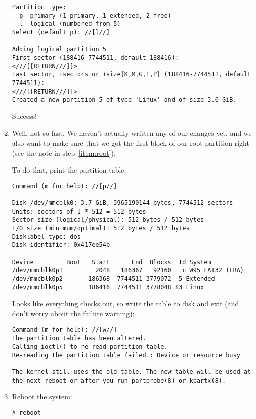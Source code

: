 \documentclass[12pt,letterpaper]{article}
\begin{document}
\begin{enumerate}
\begin{lstlisting}
Partition type:
  p  primary (1 primary, 1 extended, 2 free)
  l  logical (numbered from 5)
Select (default p): //[l//]

Adding logical partition 5
First sector (188416-7744511, default 188416):
<///[[RETURN///]]>
Last sector, +sectors or +size{K,M,G,T,P} (188416-7744511, default 7744511):
<///[[RETURN///]]>
Created a new partition 5 of type 'Linux' and of size 3.6 GiB.
\end{lstlisting}
Success!

\item Well, not so fast.  We haven't actually written any of our changes yet, and we also want to make sure that we got the first block of our root partition right (see the note in step~\ref{item:root}).

To do that, print the partition table:
\begin{lstlisting}[basicstyle=\ttfamily\footnotesize]
Command (m for help): //[p//]

Disk /dev/mmcblk0: 3.7 GiB, 3965190144 bytes, 7744512 sectors
Units: sectors of 1 * 512 = 512 bytes
Sector size (logical/physical): 512 bytes / 512 bytes
I/O size (minimum/optimal): 512 bytes / 512 bytes
Disklabel type: dos
Disk identifier: 0x417ee54b

Device         Boot   Start      End  Blocks  Id System
/dev/mmcblk0p1         2048   186367   92160   c W95 FAT32 (LBA)
/dev/mmcblk0p2       186368  7744511 3779072  5 Extended
/dev/mmcblk0p5       186416  7744511 3778048 83 Linux
\end{lstlisting}
Looks like everything checks out, so %
write the table to disk and exit (and don't worry about the failure warning):
\begin{lstlisting}
Command (m for help): //[w//]
The partition table has been altered.
Calling ioctl() to re-read partition table.
Re-reading the partition table failed.: Device or resource busy

The kernel still uses the old table. The new table will be used at the next reboot or after you run partprobe(8) or kpartx(8).
\end{lstlisting}

\item Reboot the system:
\begin{lstlisting}
# reboot
\end{lstlisting}


\end{enumerate}
\end{document}
